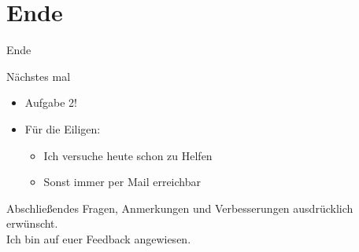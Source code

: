 \documentclass[aspectratio=169,presentation]{beamer}
\begin{document}

\section{Ende}
\begin{frame} {Ende}
  \begin{block} {Nächstes mal}
    \begin{itemize}
      \item Aufgabe 2!
      \item Für die Eiligen:
      \begin{itemize}
        \item Ich versuche heute schon zu Helfen
        \item Sonst immer per Mail erreichbar
      \end{itemize}
    \end{itemize}
  \end{block}
  \begin{exampleblock}{Abschließendes}
    Fragen, Anmerkungen und Verbesserungen ausdrücklich erwünscht.\\
    Ich bin auf euer Feedback angewiesen.
  \end{exampleblock}
\end{frame}
\end{document}
